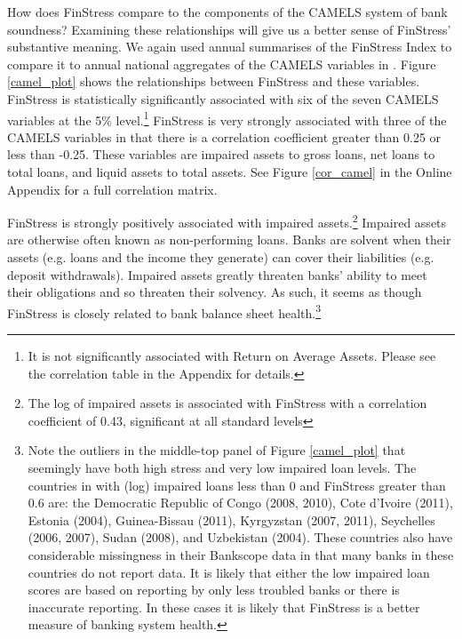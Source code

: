\documentclass[]{article}
\begin{document}
How does FinStress compare to the components of the CAMELS system of bank soundness? Examining these relationships will give us a better sense of FinStress' substantive meaning. We again used annual summarises of the FinStress Index to compare it to annual national aggregates of the CAMELS variables in \cite{Andrianova2015}. Figure \ref{camel_plot} shows the relationships between FinStress and these variables. FinStress is statistically significantly associated with six of the seven CAMELS variables at the 5\% level.\footnote{It is not significantly associated with Return on Average Assets. Please see the correlation table in the Appendix for details.} FinStress is very strongly associated with three of the CAMELS variables in that there is a correlation coefficient greater than 0.25 or less than -0.25. These variables are impaired assets to gross loans, net loans to total loans, and liquid assets to total assets. See Figure \ref{cor_camel} in the Online Appendix for a full correlation matrix.

FinStress is strongly positively associated with impaired assets.\footnote{The log of impaired assets is associated with FinStress with a correlation coefficient of 0.43, significant at all standard levels} Impaired assets are otherwise often known as non-performing loans. Banks are solvent when their assets (e.g. loans and the income they generate) can cover their liabilities (e.g. deposit withdrawals). Impaired assets greatly threaten banks' ability to meet their obligations and so threaten their solvency. As such, it seems as though FinStress is closely related to bank balance sheet health.\footnote{Note the outliers in the middle-top panel of Figure \ref{camel_plot} that seemingly have both high stress and very low impaired loan levels. The countries in with (log) impaired loans less than 0 and FinStress greater than 0.6 are: the Democratic Republic of Congo (2008, 2010), Cote d'Ivoire (2011), Estonia (2004), Guinea-Bissau (2011), Kyrgyzstan (2007, 2011), Seychelles (2006, 2007), Sudan (2008), and Uzbekistan (2004). These countries also have considerable missingness in their Bankscope data in that many banks in these countries do not report data. It is likely that either the low impaired loan scores are based on reporting by only less troubled banks or there is inaccurate reporting. In these cases it is likely that FinStress is a better measure of banking system health.}
\end{document}
